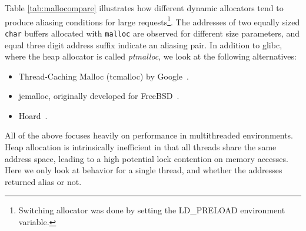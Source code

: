 \documentclass[prodmode,acmtaco]{acmsmall}
\begin{document}
{Table \ref{tab:mallocompare} illustrates how different dynamic allocators tend to produce aliasing conditions for large requests\footnote{Switching allocator was done by setting the LD\_PRELOAD environment variable.}.
The addresses of two equally sized \texttt{char} buffers allocated with \texttt{malloc} are observed for different size parameters, and equal three digit address suffix indicate an aliasing pair.
In addition to glibc, where the heap allocator is called \emph{ptmalloc}, we look at the following alternatives:
\begin{itemize}
  \item Thread-Caching Malloc (tcmalloc) by Google~\cite{TCMalloc}.
  \item jemalloc, originally developed for FreeBSD~\cite{JEMalloc}.
  \item Hoard~\cite{Berger:2000:Hoard}.
\end{itemize}
All of the above focuses heavily on performance in multithreaded environments.
Heap allocation is intrinsically inefficient in that all threads share the same address space, leading to a high potential lock contention on memory accesses.
Here we only look at behavior for a single thread, and whether the addresses returned alias or not.
\begin{table}[t]
  \label{tab:mallocompare}
  \begin{tabnote}
  \end{tabnote}
\end{table}

}
\end{document}
